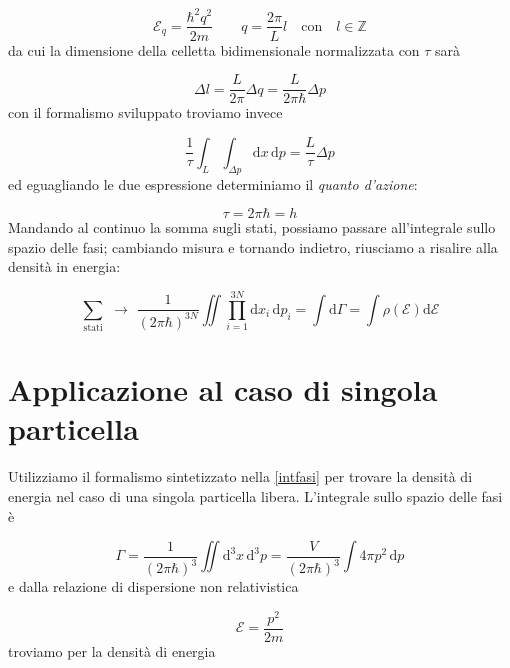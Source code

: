 \documentclass[a4paper]{report}
\begin{document}
\begin{equation}
    \mathcal{E}_q = \frac{\hbar^2 q^2}{2m} \qquad q = \frac{2\pi}{L}l \quad \text{con}\quad l \in \mathbb{Z}
\end{equation}
da cui la dimensione della celletta bidimensionale normalizzata con $\tau$ sarà

\begin{equation}
    \Delta l = \frac{L}{2\pi}\Delta q = \frac{L}{2\pi\hbar}\Delta p
\end{equation}
con il formalismo sviluppato troviamo invece

\begin{equation}
    \frac{1}{\tau}\int_L \int_{\Delta p}\mathrm{d}x\,\mathrm{d}p = \frac{L}{\tau}\Delta p
\end{equation}
ed eguagliando le due espressione determiniamo il \textit{quanto d'azione}:

\begin{equation}
    \tau = 2\pi \hbar = h
\end{equation}
Mandando al continuo la somma sugli stati, possiamo passare all'integrale sullo spazio delle fasi; cambiando misura e tornando indietro, riusciamo a risalire alla densità in energia:

\begin{equation}
    \sum_{\text{stati}}\,\,\rightarrow\,\, \frac{1}{(2\pi\hbar)^{3N}}\iint\prod_{i=1}^{3N} \mathrm{d}x_i\, \mathrm{d}p_i = \int \mathrm{d}\Gamma = \int \rho(\mathcal{E})\mathrm{d}\mathcal{E}
    \label{intfasi}
\end{equation}


\section{Applicazione al caso di singola particella}

Utilizziamo il formalismo sintetizzato nella \eqref{intfasi} per trovare la densità di energia nel caso di una singola particella libera. L'integrale sullo spazio delle fasi è 

\begin{equation}
    \Gamma = \frac{1}{(2\pi\hbar)^3}\iint\mathrm{d}^3 x\,\mathrm{d}^3 p = \frac{V}{(2\pi\hbar)^3}\int 4\pi p^2\,\mathrm{d} p
\end{equation}
e dalla relazione di dispersione non relativistica 

\begin{equation}
    \mathcal{E} = \frac{p^2}{2m}
\end{equation}
troviamo per la densità di energia
\end{document}
